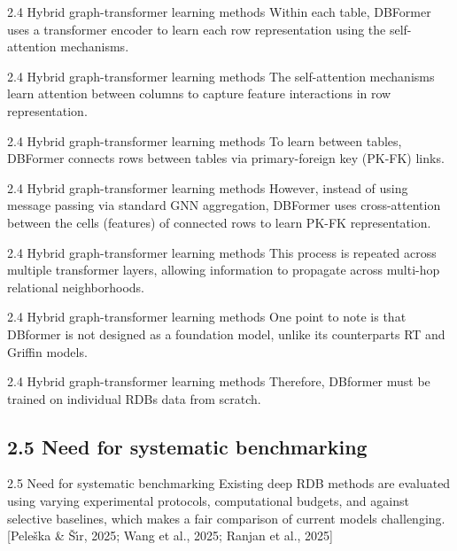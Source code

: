 \documentclass[aspectratio=169,10pt]{beamer}
\newcommand{\cit}[1]{{\scriptsize\color{gray}[#1]}}
\begin{document}
\begin{frame}{2.4 Hybrid graph-transformer learning methods}
Within each table, DBFormer uses a transformer encoder to learn each row representation using the self-attention mechanisms.
\end{frame}

\begin{frame}{2.4 Hybrid graph-transformer learning methods}
The self-attention mechanisms learn attention between columns to capture feature interactions in row representation.
\end{frame}

\begin{frame}{2.4 Hybrid graph-transformer learning methods}
To learn between tables, DBFormer connects rows between tables via primary-foreign key (PK-FK) links.
\end{frame}

\begin{frame}{2.4 Hybrid graph-transformer learning methods}
However, instead of using message passing via standard GNN aggregation, DBFormer uses cross-attention between the cells (features) of connected rows to learn PK-FK representation.
\end{frame}

\begin{frame}{2.4 Hybrid graph-transformer learning methods}
This process is repeated across multiple transformer layers, allowing information to propagate across multi-hop relational neighborhoods.
\end{frame}

\begin{frame}{2.4 Hybrid graph-transformer learning methods}
One point to note is that DBformer is not designed as a foundation model, unlike its counterparts RT and Griffin models.
\end{frame}

\begin{frame}{2.4 Hybrid graph-transformer learning methods}
Therefore, DBformer must be trained on individual RDBs data from scratch.
\end{frame}

\subsection{2.5 Need for systematic benchmarking}

\begin{frame}{2.5 Need for systematic benchmarking}
Existing deep RDB methods are evaluated using varying experimental protocols, computational budgets, and against selective baselines, which makes a fair comparison of current models challenging.
\cit{Pele\v{s}ka \& \v{S}\'{\i}r, 2025; Wang et al., 2025; Ranjan et al., 2025}
\end{frame}
\end{document}
